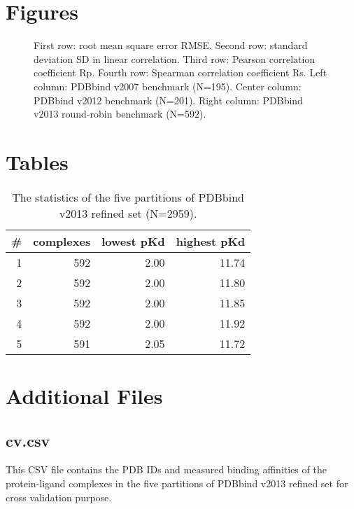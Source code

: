 \documentclass[twocolumn]{bmcart}
\begin{document}
\begin{backmatter}

\section*{Figures}

\begin{figure}[h]
\caption{ First row: root mean square error RMSE. Second row: standard deviation SD in linear correlation. Third row: Pearson correlation coefficient Rp. Fourth row: Spearman correlation coefficient Rs. Left column: PDBbind v2007 benchmark (N=195). Center column: PDBbind v2012 benchmark (N=201). Right column: PDBbind v2013 round-robin benchmark (N=592).}
\label{fig:stat}
\end{figure}


\section*{Tables}

\begin{table}[ht]
\caption{The statistics of the five partitions of PDBbind v2013 refined set (N=2959).}
\label{tbl:partitions}
\begin{tabular}{rrrr}
\hline
\# & complexes & lowest pKd & highest pKd\\
\hline
1 & 592 & 2.00 & 11.74\\
2 & 592 & 2.00 & 11.80\\
3 & 592 & 2.00 & 11.85\\
4 & 592 & 2.00 & 11.92\\
5 & 591 & 2.05 & 11.72\\
\hline
\end{tabular}
\end{table}


\section*{Additional Files}

\subsection*{cv.csv}
This CSV file contains the PDB IDs and measured binding affinities of the protein-ligand complexes in the five partitions of PDBbind v2013 refined set for cross validation purpose.

\end{backmatter}
\end{document}
